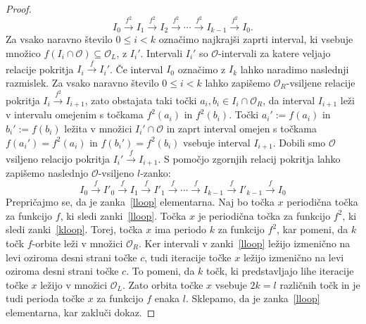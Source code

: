 \documentclass[../TG_magistrsko_delo_sections.tex]{subfiles}
\begin{document}
\begin{proof}
\begin{equation}\label{kloop}
I_0 \xrightarrow{f^2} I_1 \xrightarrow{f^2} I_2 \xrightarrow{f^2} \cdots \xrightarrow{f^2} I_{k-1} \xrightarrow{f^2} I_0.
\end{equation}
Za vsako naravno število $0 \leq i < k$ označimo najkrajši zaprti interval, ki vsebuje množico $f(I_i \cap \mathcal{O}) \subseteq \mathcal{O}_L$, z $I_i'$. Intervali $I_i'$ so $\mathcal{O}$-intervali za katere veljajo relacije pokritja $I_i \xrightarrow{f} I_i'$. Če interval $I_0$ označimo z $I_k$ lahko naradimo naslednji razmislek. Za vsako naravno število $0 \leq i < k$ lahko zapišemo $\mathcal{O}_R$-vsiljene relacije pokritja $I_i \xrightarrow{f^2} I_{i+1}$, zato obstajata taki točki $a_i, b_i \in I_i \cap \mathcal{O}_R$, da interval $I_{i+1}$ leži v intervalu omejenim s točkama $f^2(a_i)$ in $f^2(b_i)$. Točki $a_i' := f(a_i)$ in $b_i' := f(b_i)$ ležita v množici $I_i' \cap \mathcal{O}$ in zaprt interval omejen s točkama $f(a_i') = f^2(a_i)$ in $f(b_i') = f^2(b_i)$ vsebuje interval $I_{i+1}$. Dobili smo $\mathcal{O}$ vsiljeno relacijo pokritja $I_i' \xrightarrow{f} I_{i+1}$. S pomočjo zgornjih relacij pokritja lahko zapišemo naslednjo $\mathcal{O}$-vsiljeno $l$-zanko:
\begin{equation}\label{lloop}
I_0 \xrightarrow{f} I'_0 \xrightarrow{f} I_1 \xrightarrow{f} I'_1 \xrightarrow{f} \cdots \xrightarrow{f} I_{k-1} \xrightarrow{f} I'_{k-1} \xrightarrow{f} I_0
\end{equation}
Prepričajmo se, da je zanka~\eqref{lloop} elementarna. Naj bo točka $x$ periodična točka za funkcijo $f$, ki sledi zanki~\eqref{lloop}. Točka $x$ je periodična točka za funkcijo $f^2$, ki sledi zanki~\eqref{kloop}. Torej, točka $x$ ima periodo $k$ za funkcijo $f^2$, kar pomeni, da $k$ točk $f$-orbite leži v množici $\mathcal{O}_R$. Ker intervali v zanki~\eqref{lloop} ležijo izmenično na levi oziroma desni strani točke $c$, tudi iteracije točke $x$ ležijo izmenično na levi oziroma desni strani točke $c$. To pomeni, da $k$ točk, ki predstavljajo lihe iteracije točke $x$ ležijo v množici $\mathcal{O}_L$. Zato orbita točke $x$ vsebuje $2k = l$ različnih točk in je tudi perioda točke $x$ za funkcijo $f$ enaka $l$. Sklepamo, da je zanka~\eqref{lloop} elementarna, kar zakluči dokaz.
\end{proof}
\end{document}
